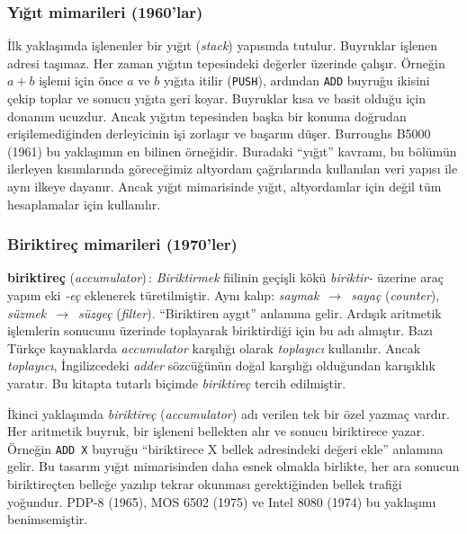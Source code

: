 \subsubsection*{Yığıt mimarileri (1960'lar)}
İlk yaklaşımda işlenenler bir yığıt (\emph{stack}) yapısında tutulur. Buyruklar işlenen adresi taşımaz. Her zaman yığıtın tepesindeki değerler üzerinde çalışır. Örneğin $a + b$ işlemi için önce $a$ ve $b$ yığıta itilir (\texttt{PUSH}), ardından \texttt{ADD} buyruğu ikisini çekip toplar ve sonucu yığıta geri koyar. Buyruklar kısa ve basit olduğu için donanım ucuzdur. Ancak yığıtın tepesinden başka bir konuma doğrudan erişilemediğinden derleyicinin işi zorlaşır ve başarım düşer. Burroughs B5000 (1961) bu yaklaşımın en bilinen örneğidir. Buradaki ``yığıt'' kavramı, bu bölümün ilerleyen kısımlarında göreceğimiz altyordam çağrılarında kullanılan veri yapısı ile aynı ilkeye dayanır. Ancak yığıt mimarisinde yığıt, altyordamlar için değil tüm hesaplamalar için kullanılır.

\subsubsection*{Biriktireç mimarileri (1970'ler)}

\begin{terimnotu}
\textbf{biriktireç} (\emph{accumulator})\,: \emph{Biriktirmek} fiilinin geçişli kökü \emph{biriktir-} üzerine araç yapım eki \emph{-eç} eklenerek türetilmiştir. Aynı kalıp: \emph{saymak}~$\to$~\emph{sayaç} (\emph{counter}), \emph{süzmek}~$\to$~\emph{süzgeç} (\emph{filter}). ``Biriktiren aygıt'' anlamına gelir. Ardışık aritmetik işlemlerin sonucunu üzerinde toplayarak biriktirdiği için bu adı almıştır. Bazı Türkçe kaynaklarda \emph{accumulator} karşılığı olarak \emph{toplayıcı} kullanılır. Ancak \emph{toplayıcı}, İngilizcedeki \emph{adder} sözcüğünün doğal karşılığı olduğundan karışıklık yaratır. Bu kitapta tutarlı biçimde \emph{biriktireç} tercih edilmiştir.
\end{terimnotu}

İkinci yaklaşımda \emph{biriktireç} (\emph{accumulator}) adı verilen tek bir özel yazmaç vardır. Her aritmetik buyruk, bir işleneni bellekten alır ve sonucu biriktirece yazar. Örneğin \texttt{ADD X} buyruğu ``biriktirece X bellek adresindeki değeri ekle'' anlamına gelir. Bu tasarım yığıt mimarisinden daha esnek olmakla birlikte, her ara sonucun biriktireçten belleğe yazılıp tekrar okunması gerektiğinden bellek trafiği yoğundur. PDP-8 (1965), MOS 6502 (1975) ve Intel 8080 (1974) bu yaklaşımı benimsemiştir.

